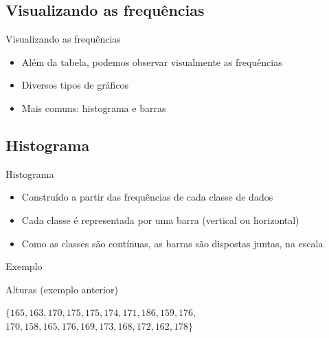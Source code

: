 \documentclass{beamer}
\begin{document}
\subsection{Visualizando as frequências}

\begin{frame}{Visualizando as frequências}
  \begin{itemize}
  \item Além da tabela, podemos observar \alert{visualmente} as frequências
  \item Diversos tipos de gráficos
  \item Mais comuns: histograma e barras
  \end{itemize}
\end{frame}

\subsection{Histograma}

\begin{frame}{Histograma}
  \begin{itemize}
  \item Construído a partir das frequências de cada \alert{classe} de dados
  \item Cada classe é representada por uma barra (vertical ou horizontal)
  \item Como as classes são contínuas, as \alert{barras} são dispostas \alert{juntas}, na escala
  \end{itemize}
\end{frame}

\begin{frame}{Exemplo}
  \begin{example}
    Alturas (exemplo anterior)

    \bigskip
    \centering $ \{ 165,163,170,175,175,174,171,186,159,176,$
$170,158,165,176,169,173,168,172,162,178 \} $

  \end{example}
\end{frame}
\end{document}
